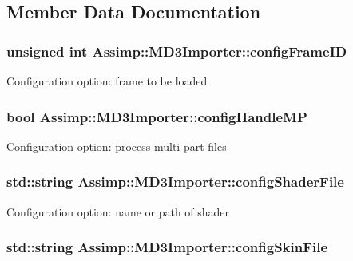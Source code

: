 \subsection{Member Data Documentation}
\hypertarget{class_assimp_1_1_m_d3_importer_a8510742e876fd7c795ee4fd44d07d3d1}{
\subsubsection[{config\+Frame\+I\+D}]{\setlength{\rightskip}{0pt plus 5cm}unsigned int Assimp\+::\+M\+D3\+Importer\+::config\+Frame\+I\+D\hspace{0.3cm}{\ttfamily [protected]}}}\label{class_assimp_1_1_m_d3_importer_a8510742e876fd7c795ee4fd44d07d3d1}
Configuration option\+: frame to be loaded \hypertarget{class_assimp_1_1_m_d3_importer_a439499e039067b81559efab0d04fa83a}{
\subsubsection[{config\+Handle\+M\+P}]{\setlength{\rightskip}{0pt plus 5cm}bool Assimp\+::\+M\+D3\+Importer\+::config\+Handle\+M\+P\hspace{0.3cm}{\ttfamily [protected]}}}\label{class_assimp_1_1_m_d3_importer_a439499e039067b81559efab0d04fa83a}
Configuration option\+: process multi-\/part files \hypertarget{class_assimp_1_1_m_d3_importer_add356800765dd174de7fbdf0ba53e218}{
\subsubsection[{config\+Shader\+File}]{\setlength{\rightskip}{0pt plus 5cm}std\+::string Assimp\+::\+M\+D3\+Importer\+::config\+Shader\+File\hspace{0.3cm}{\ttfamily [protected]}}}\label{class_assimp_1_1_m_d3_importer_add356800765dd174de7fbdf0ba53e218}
Configuration option\+: name or path of shader \hypertarget{class_assimp_1_1_m_d3_importer_a0d7d627dfa48468e38e600d353ebe552}{
\subsubsection[{config\+Skin\+File}]{\setlength{\rightskip}{0pt plus 5cm}std\+::string Assimp\+::\+M\+D3\+Importer\+::config\+Skin\+File\hspace{0.3cm}{\ttfamily [protected]}}}\label{class_assimp_1_1_m_d3_importer_a0d7d627dfa48468e38e600d353ebe552}

